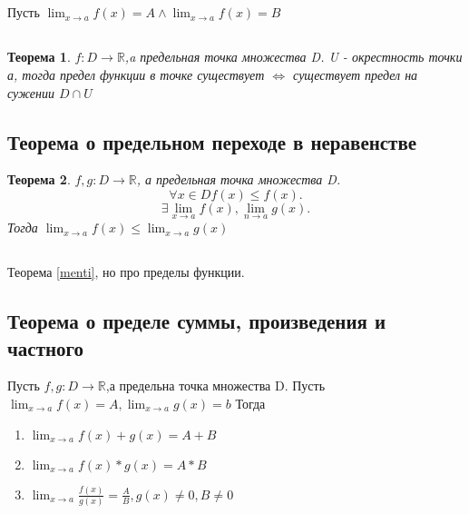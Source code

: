 \documentclass{article}
\newtheorem{theorem}{Теорема}
\begin{document}
\subsection{}
Пусть $\lim_{x \to a} f(x) = A \land \lim_{x \to a} f(x) = B $
\subsection{}
\begin{theorem}
    $f : D \to \mathbb{R}$,a предельная точка множества D. U - окрестность точки а, тогда предел
    функции в точке существует  $\iff$ существует предел на сужении  $D \cap U$
\end{theorem}
\subsection{Теорема о предельном переходе в неравенстве}
\begin{theorem}
    $f,g : D \to \mathbb{R}$, а предельная точка множества D.
    \[
    \forall  x \in D f(x) \le  f(x) 
    .\] 
    \[
    \exists \lim_{x \to a} f(x), \lim_{n \to a} g(x)
    .\] 
    Тогда $\lim_{x \to a} f(x) \le  \lim_{x \to a} g(x)$
\end{theorem}
\subsection{}\label{menti2}
Теорема \ref{menti}, но про пределы функции.
\subsection{Теорема о пределе суммы, произведения и частного}
Пусть $f,g: D \to \mathbb{R}$,а предельна точка множества D.
Пусть $\lim_{x \to a} f(x) = A, \lim_{x \to a} g(x) = b $
Тогда
\begin{enumerate}
    \item $\lim_{x \to a} f(x) + g(x) = A + B$
    \item $\lim_{x \to a} f(x) * g(x) = A*B$
    \item $\lim_{x \to a} \frac{f(x)}{g(x)} = \frac{A}{B}, g(x) \neq 0, B \neq 0$
\end{enumerate}
\section{}
\end{document}

